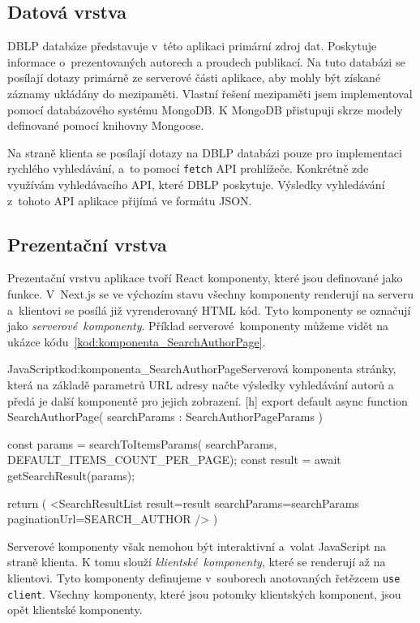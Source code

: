 \documentclass[
  biblatex,
  sourcecodes,
  glossaries,
  index
]{kidiplom}
\begin{document}
\subsection{Datová vrstva}

DBLP databáze představuje v~této aplikaci primární zdroj dat. Poskytuje informace o~prezentovaných autorech a proudech publikací. Na tuto databázi se posílají dotazy primárně ze serverové části aplikace, aby mohly být získané záznamy ukládány do mezipaměti. Vlastní řešení mezipaměti jsem implementoval pomocí databázového systému MongoDB. K MongoDB přistupuji skrze modely definované pomocí knihovny Mongoose.

Na straně klienta se posílají dotazy na DBLP databázi pouze pro implementaci rychlého vyhledávání, a~to pomocí \texttt{fetch} API prohlížeče. Konkrétně zde využívám vyhledávacího API, které DBLP poskytuje. Výsledky vyhledávání z~tohoto API aplikace přijímá ve formátu JSON.

\subsection{Prezentační vrstva}

Prezentační vrstvu aplikace tvoří React komponenty, které jsou definované jako funkce. V~Next.js se ve výchozím stavu všechny komponenty renderují na serveru a~klientovi se posílá již vyrenderovaný HTML kód. Tyto komponenty se označují jako \textit{serverové~komponenty}. Příklad serverové~komponenty můžeme vidět na ukázce kódu~\ref{kod:komponenta_SearchAuthorPage}.

\begin{kicode}{JavaScript}{kod:komponenta_SearchAuthorPage}{Serverová komponenta stránky, která na základě parametrů URL adresy načte výsledky vyhledávání autorů a předá je další komponentě pro jejich zobrazení.} [h]
export default async function SearchAuthorPage(
    { searchParams }: SearchAuthorPageParams
) {
    const params = searchToItemsParams(
        searchParams,
        DEFAULT_ITEMS_COUNT_PER_PAGE);
    const result = await getSearchResult(params);

    return (
        <SearchResultList
            result={result}
            searchParams={searchParams}
            paginationUrl={SEARCH_AUTHOR} />
    )
}
\end{kicode}

Serverové komponenty však nemohou být interaktivní a~volat JavaScript na straně klienta. K tomu slouží \textit{klientské~komponenty}, které se renderují až na klientovi. Tyto komponenty definujeme v~souborech anotovaných řetězcem \texttt{use client}. Všechny komponenty, které jsou potomky klientských komponent, jsou opět klientské komponenty.
\end{document}
